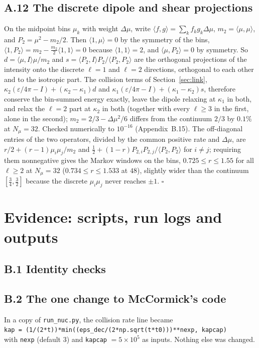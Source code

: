 \documentclass[11pt]{article}
\begin{document}
\subsection*{A.12 The discrete dipole and shear projections}
On the midpoint bins $\mu_k$ with weight $\Delta\mu$, write $\langle f,g\rangle=\sum_kf_kg_k\Delta\mu$, $m_2=\langle\mu,\mu\rangle$, and $P_2=\mu^2-m_2/2$. Then $\langle1,\mu\rangle=0$ by the symmetry of the bins, $\langle1,P_2\rangle=m_2-\tfrac{m_2}{2}\langle1,1\rangle=0$ because $\langle1,1\rangle=2$, and $\langle\mu,P_2\rangle=0$ by symmetry. So $d=\langle\mu,I\rangle\mu/m_2$ and $s=\langle P_2,I\rangle P_2/\langle P_2,P_2\rangle$ are the orthogonal projections of the intensity onto the discrete $\ell=1$ and $\ell=2$ directions, orthogonal to each other and to the isotropic part. The collision terms of Section~\ref{sec:link}, $\kappa_2(\varepsilon/4\pi-I)+(\kappa_2-\kappa_1)d$ and $\kappa_1(\varepsilon/4\pi-I)+(\kappa_1-\kappa_2)s$, therefore conserve the bin-summed energy exactly, leave the dipole relaxing at $\kappa_1$ in both, and relax the $\ell=2$ part at $\kappa_2$ in both (together with every $\ell\ge3$ in the first, alone in the second); $m_2=2/3-\Delta\mu^2/6$ differs from the continuum $2/3$ by $0.1\%$ at $N_\mu=32$. Checked numerically to $10^{-16}$ (Appendix~B.15). The off-diagonal entries of the two operators, divided by the common positive rate and $\Delta\mu$, are $r/2+(r-1)\mu_i\mu_j/m_2$ and $\tfrac12+(1-r)P_{2,i}P_{2,j}/\langle P_2,P_2\rangle$ for $i\ne j$; requiring them nonnegative gives the Markov windows on the bins, $0.725\le r\le1.55$ for all $\ell\ge2$ at $N_\mu=32$ ($0.734\le r\le1.533$ at $48$), slightly wider than the continuum $[\tfrac34,\tfrac32]$ because the discrete $\mu_i\mu_j$ never reaches $\pm1$. $\square$

\section{Evidence: scripts, run logs and outputs}
\subsection*{B.1 Identity checks}


\subsection*{B.2 The one change to McCormick's code}
In a copy of \texttt{run\_nuc.py}, the collision rate line became\\
\texttt{kap = (1/(2*t))*min((eps\_dec/(2*np.sqrt(t*t0)))**nexp, kapcap)}\\
with \texttt{nexp} (default 3) and \texttt{kapcap} $=5\times10^5$ as inputs. Nothing else was changed.


\end{document}
